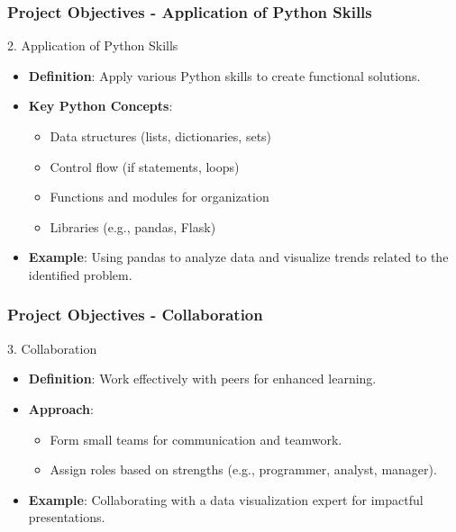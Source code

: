 \documentclass{beamer}
\begin{document}
\begin{frame}[fragile]
    \frametitle{Project Objectives - Application of Python Skills}
    \begin{block}{2. Application of Python Skills}
        \begin{itemize}
            \item \textbf{Definition}: Apply various Python skills to create functional solutions.
            \item \textbf{Key Python Concepts}:
                \begin{itemize}
                    \item Data structures (lists, dictionaries, sets)
                    \item Control flow (if statements, loops)
                    \item Functions and modules for organization
                    \item Libraries (e.g., pandas, Flask)
                \end{itemize}
            \item \textbf{Example}: Using pandas to analyze data and visualize trends related to the identified problem.
        \end{itemize}
    \end{block}
\end{frame}

\begin{frame}[fragile]
    \frametitle{Project Objectives - Collaboration}
    \begin{block}{3. Collaboration}
        \begin{itemize}
            \item \textbf{Definition}: Work effectively with peers for enhanced learning.
            \item \textbf{Approach}:
                \begin{itemize}
                    \item Form small teams for communication and teamwork.
                    \item Assign roles based on strengths (e.g., programmer, analyst, manager).
                \end{itemize}
            \item \textbf{Example}: Collaborating with a data visualization expert for impactful presentations.
        \end{itemize}
    \end{block}
\end{frame}
\end{document}
